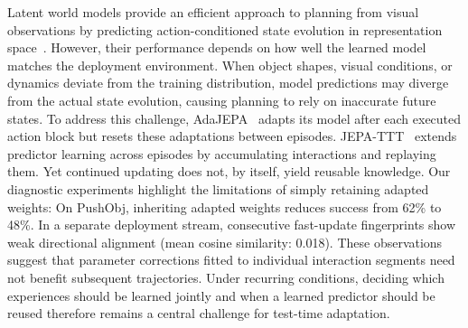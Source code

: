 Latent world models provide an efficient approach to planning from visual observations by predicting action-conditioned state evolution in representation space~\cite{lecun2022path,zhou2024dinowm,assran2025vjepa2,maes2026lewm}. However, their performance depends on how well the learned model matches the deployment environment. When object shapes, visual conditions, or dynamics deviate from the training distribution, model predictions may diverge from the actual state evolution, causing planning to rely on inaccurate future states.
%
To address this challenge, 
AdaJEPA~\cite{wang2026adajepa} adapts its model after each executed action block but resets these adaptations between episodes.
%
JEPA-TTT~\cite{zhang2026jepattt} extends predictor learning across episodes by accumulating interactions and replaying them. Yet continued updating does not, by itself, yield reusable knowledge. 
%
Our diagnostic experiments highlight the limitations of simply retaining adapted weights: 
% 
On PushObj, inheriting adapted weights reduces success from 62\% to 48\%. In a separate deployment stream, consecutive fast-update fingerprints show weak directional alignment (mean cosine similarity: 0.018). 
These observations suggest that parameter corrections fitted to individual interaction segments need not benefit subsequent trajectories. Under recurring conditions, deciding which experiences should be learned jointly and when a learned predictor should be reused therefore remains a central challenge for test-time adaptation.

